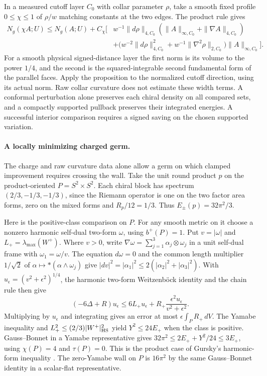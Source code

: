 In a measured cutoff layer \(C_0\) with collar parameter \(\rho\),
take a smooth fixed profile \(0\le\chi\le1\) of \(\rho/w\)
matching constants at the two edges. The product rule gives
\begin{align*}
 N_g(\chi A;U)\le N_g(A;U)+C_\chi\big[&
 w^{-1}\|d\rho\|_{4,C_0}
       (\|A\|_{\infty,C_0}+\|\nabla A\|_{4,C_0})\\
 &+\big(w^{-2}\|d\rho\|_{4,C_0}^2
           +w^{-1}\|\nabla^2\rho\|_{2,C_0}\big)
             \|A\|_{\infty,C_0}\big].
\end{align*}
For a smooth physical signed-distance layer the first norm is its
volume to the power \(1/4\), and the second is the squared-integrable
second fundamental form of the parallel faces. Apply the proposition
to the normalized cutoff direction, using its actual norm. Raw
collar curvature does not estimate these width terms. A conformal
perturbation alone preserves each chiral density on all compared
sets, and a compactly supported pullback preserves their integrated
energies. A successful interior comparison requires a signed
saving on the chosen supported variation.

\paragraph{A locally minimizing charged germ.}
The charge and raw curvature data alone allow a germ on which
clamped improvement requires crossing the wall. Take the unit
round product \(p\) on the product-oriented \(P=S^2\times S^2\).
Each chiral block has spectrum \((2/3,-1/3,-1/3)\), since the
Riemann operator is one on the two factor area forms, zero on
the mixed forms and \(R_p/12=1/3\). Thus \(E_\pm(p)=32\pi^2/3\).

Here is the positive-class comparison on \(P\).
For any smooth metric on it choose a nonzero harmonic self-dual
two-form \(\omega\), using \(b^+(P)=1\). Put \(v=|\omega|\) and
\(L_+=\lambda_{\max}(W^+)\). Where \(v>0\), write
\(\nabla\omega=\sum_{j=1}^3\alpha_j\otimes\omega_j\) in a unit
self-dual frame with \(\omega_1=\omega/v\). The equation
\(d\omega=0\) and the common length multiplier \(1/\sqrt2\)
of \(\alpha\mapsto*(\alpha\wedge\omega_j)\) give
\(|dv|^2=|\alpha_1|^2\le2(|\alpha_2|^2+|\alpha_3|^2)\).
With \(u_\epsilon=(v^2+\epsilon^2)^{1/4}\), the harmonic
two-form Weitzenb\"ock identity and the chain rule then give
\[
 (-6\Delta+R)u_\epsilon
   \le 6L_+u_\epsilon+
          R_+\frac{\epsilon^2 u_\epsilon}{v^2+\epsilon^2}.
\]
Multiplying by \(u_\epsilon\) and integrating gives an error
at most \(\epsilon\int_P R_+\,dV\). The Yamabe inequality and
\(L_+^2\le(2/3)|W^+|^2_{\rm HS}\) yield \(Y^2\le24E_+\)
when the class is positive. Gauss--Bonnet in a Yamabe
representative gives \(32\pi^2\le2E_++Y^2/24\le3E_+\),
using \(\chi(P)=4\) and \(\tau(P)=0\).
This is the product case of Gursky's harmonic-form inequality
\cite{Gursky1998WeylFunctional}.
The zero-Yamabe wall on \(P\) is \(16\pi^2\) by the same
Gauss--Bonnet identity in a scalar-flat representative.

